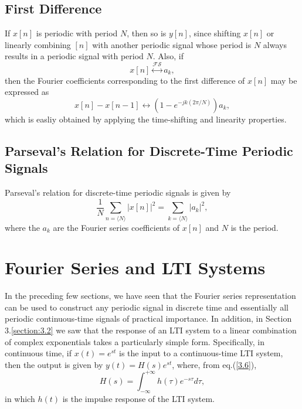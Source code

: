 \documentclass[a4paper,twoside]{book}
\begin{document}
\subsection{First Difference}

If $x[n]$ is periodic with period $N$, then so is $y[n]$, since shifting $x[n]$ or linearly combining $[n]$ with another periodic signal whose period is $N$ always results in a periodic signal with period $N$. Also, if $$x[n]\overset{\mathcal{FS}}{\longleftrightarrow}a_k,$$ then the Fourier coefficients corresponding to the first difference of $x[n]$ may be expressed as
\begin{equation}
    x[n]-x[n-1]\longleftrightarrow(1-e^{-jk(2\pi/N)})a_k,
    \label{3.109}
\end{equation}
which is easliy obtained by applying the time-shifting and linearity properties.

\subsection{Parseval's Relation for Discrete-Time Periodic Signals}

Parseval's relation for discrete-time periodic signals is given by
\begin{equation}
    \frac1N\sum_{n=\langle N\rangle}|x[n]|^2=\sum_{k=\langle N\rangle}|a_k|^2,
    \label{3.110}
\end{equation}
where the $a_k$ are the Fourier series coefficients of $x[n]$ and $N$ is the period.

\section{Fourier Series and LTI Systems}
\label{section:3.8}

In the preceding few sections, we have seen that the Fourier series representation can be used to construct any periodic signal in discrete time and essentially all periodic continuous-time signals of practical importance. In addition, in Section 3.\ref{section:3.2} we saw that the response of an LTI system to a linear combination of complex exponentials takes a particularly simple form. Specifically, in continuous time, if $x(t)=e^{st}$ is the input to a continuous-time LTI system, then the output is given by $y(t)=H(s)e^{st}$, where, from eq.\;(\ref{3.6}),
\begin{equation}
    H(s)=\int_{-\infty}^{+\infty}h(\tau)e^{-s\tau}d\tau,
    \label{3.119}
\end{equation}
in which $h(t)$ is the impulse response of the LTI system.
\end{document}
